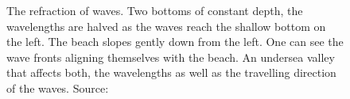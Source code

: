 \begin{figure}[p]
 \centering
 \hfill
 \hfill
 \caption{The refraction of waves.
 Two bottoms of constant depth, the
wavelengths are halved as the waves reach the shallow bottom on the left.
 The beach slopes gently down from
the left. One can see the wave fronts aligning themselves with the beach.
 An undersea valley that affects
both, the wavelengths as well as the travelling direction of the waves.
Source:~\cite{Fournier:1986}}
\label{fig:fournier1986:refraction}
\end{figure}

